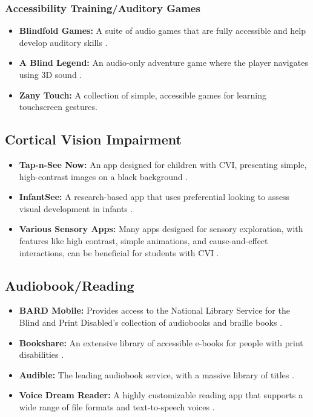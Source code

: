 \subsubsection{Accessibility Training/Auditory Games}\label{ch2:sssec:games}
\begin{itemize}
	\item \textbf{Blindfold Games:} A suite of audio games that are fully accessible and help develop auditory skills \supercite{BlindfoldGames}.
	\item \textbf{A Blind Legend:} An audio-only adventure game where the player navigates using 3D sound \supercite{ABlindLegend}.
	\item \textbf{Zany Touch:} A collection of simple, accessible games for learning touchscreen gestures.
\end{itemize}

\subsection{Cortical Vision Impairment}\label{ch2:ssec:cvi-apps}
\begin{itemize}
	\item \textbf{Tap-n-See Now:} An app designed for children with CVI, presenting simple, high-contrast images on a black background \supercite{TapNSeeNow}.
	\item \textbf{InfantSee:} A research-based app that uses preferential looking to assess visual development in infants \supercite{InfantSee}.
	\item \textbf{Various Sensory Apps:} Many apps designed for sensory exploration, with features like high contrast, simple animations, and cause-and-effect interactions, can be beneficial for students with CVI \supercite{SensoryApps}.
\end{itemize}

\subsection{Audiobook/Reading}\label{ch2:ssec:reading-apps}
\begin{itemize}
	\item \textbf{BARD Mobile:} Provides access to the National Library Service for the Blind and Print Disabled's collection of audiobooks and braille books \supercite{BARDMobile}.
	\item \textbf{Bookshare:} An extensive library of accessible e-books for people with print disabilities \supercite{Bookshare}.
	\item \textbf{Audible:} The leading audiobook service, with a massive library of titles \supercite{Audible}.
	\item \textbf{Voice Dream Reader:} A highly customizable reading app that supports a wide range of file formats and text-to-speech voices \supercite{VoiceDreamReader}.
\end{itemize}

